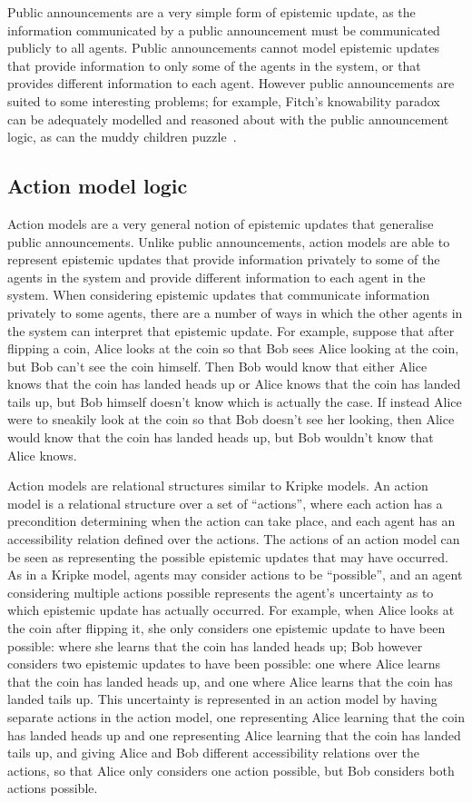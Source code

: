Public announcements are a very simple form of epistemic update, as the information communicated by a public announcement must be communicated publicly to all agents.
Public announcements cannot model epistemic updates that provide information to only some of the agents in the system, or that provides different information to each agent.
However public announcements are suited to some interesting problems; for example, Fitch's knowability paradox~\cite{fitch:1963} can be adequately modelled and reasoned about with the public announcement logic, as can the muddy children puzzle~\cite{barwise:1981, vanditmarsch:2007}.

\subsection{Action model logic}

Action models are a very general notion of epistemic updates that generalise public announcements.
Unlike public announcements, action models are able to represent epistemic updates that provide information privately to some of the agents in the system and provide different information to each agent in the system.
When considering epistemic updates that communicate information privately to some agents, there are a number of ways in which the other agents in the system can interpret that epistemic update. 
For example, suppose that after flipping a coin, Alice looks at the coin so that Bob sees Alice looking at the coin, but Bob can't see the coin himself. Then Bob would know that either Alice knows that the coin has landed heads up or Alice knows that the coin has landed tails up, but Bob himself doesn't know which is actually the case.
If instead Alice were to sneakily look at the coin so that Bob doesn't see her looking, then Alice would know that the coin has landed heads up, but Bob wouldn't know that Alice knows.

Action models are relational structures similar to Kripke models.
An action model is a relational structure over a set of ``actions'', where each action has a precondition determining when the action can take place, and each agent has an accessibility relation defined over the actions.
The actions of an action model can be seen as representing the possible epistemic updates that may have occurred.
As in a Kripke model, agents may consider actions to be ``possible'', and an agent considering multiple actions possible represents the agent's uncertainty as to which epistemic update has actually occurred.
For example, when Alice looks at the coin after flipping it, she only considers one epistemic update to have been possible: where she learns that the coin has landed heads up; Bob however considers two epistemic updates to have been possible: one where Alice learns that the coin has landed heads up, and one where Alice learns that the coin has landed tails up.
This uncertainty is represented in an action model by having separate actions in the action model, one representing Alice learning that the coin has landed heads up and one representing Alice learning that the coin has landed tails up, and giving Alice and Bob different accessibility relations over the actions, so that Alice only considers one action possible, but Bob considers both actions possible.


